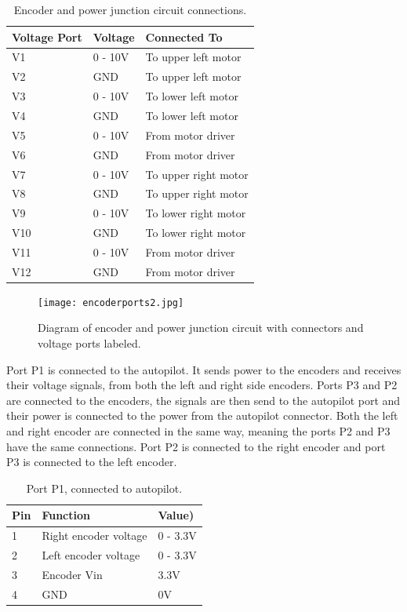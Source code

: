 \documentclass[letterpaper,12pt]{report}
\begin{document}
\begin{table}[h]
	\centering
	\begin{tabular}{| l | l | l |}
 		\hline
 		Voltage Port & Voltage & Connected To \\ \hline 
 		V1 & 0 - 10V  & To upper left motor \\ \hline
 		V2 & GND & To upper left motor \\ \hline
 		V3 & 0 - 10V & To lower left motor \\ \hline
 		V4 & GND & To lower left motor \\ \hline
 		V5 & 0 - 10V & From motor driver \\ \hline
 		V6 & GND & From motor driver \\ \hline
 		V7 & 0 - 10V & To upper right motor \\ \hline
 		V8 & GND & To upper right motor \\ \hline
 		V9 & 0 - 10V & To lower right motor\\ \hline
 		V10 & GND & To lower right motor \\ \hline
 		V11 & 0 - 10V & From motor driver \\ \hline
 		V12 & GND & From motor driver \\ \hline
	\end{tabular}
	\caption{Encoder and power junction circuit connections.}
\end{table}

\begin{figure}[h]
	\centering
	\texttt{[image: encoderports2.jpg]}
	\caption{Diagram of encoder and power junction circuit with connectors and voltage ports labeled.}
	\label{Figure 1:}
\end{figure}
Port P1 is connected to the autopilot. It sends power to the encoders and receives their voltage signals, from both the left and right side encoders. Ports P3 and P2 are connected to the encoders, the signals are then send to the autopilot port and their power is connected to the power from the autopilot connector. Both the left and right encoder are connected in the same way, meaning the ports P2 and P3 have the same connections. Port P2 is connected to the right encoder and port P3 is connected to the left encoder.
 
\begin{table}[h]
	\centering
	\begin{tabular}{| l | l | l |}
 		\hline
 		Pin & Function & Value) \\ \hline 
 		1 & Right encoder voltage & 0 - 3.3V \\ \hline
 		2 & Left encoder voltage & 0 - 3.3V \\ \hline
 		3 & Encoder Vin & 3.3V \\ \hline
 		4 & GND & 0V \\ \hline
	\end{tabular}
	\caption{Port P1, connected to autopilot.}
\end{table}
\end{document}
